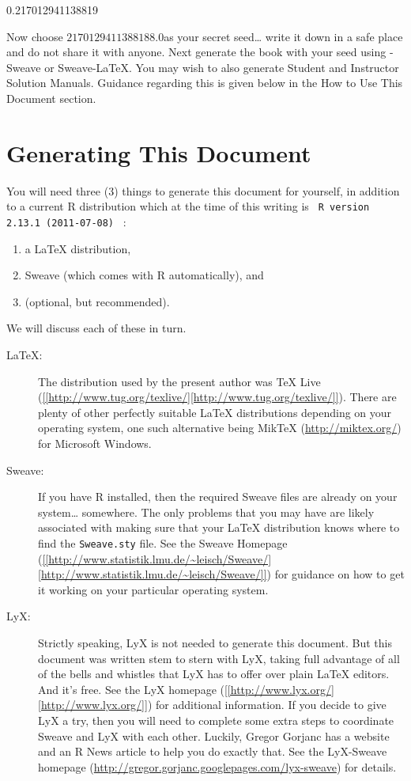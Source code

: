 \documentclass[captions=tableheading]{scrbook}
\begin{document}
0.217012941138819

Now choose \(  2170129411388188.0 \)as your secret seed\ldots{} write it down in a safe place and do not share it with anyone. Next generate the book with your seed using \LyX{}-Sweave or Sweave-\LaTeX{}. You may wish to also generate Student and Instructor Solution Manuals. Guidance regarding this is given below in the How to Use This Document section.
\section{Generating This Document \label{sec:Generating-This-Document}}
\label{sec-23-1}


You will need three (3) things to generate this document for yourself, in addition to a current \textsf{R} distribution which at the time of this writing is \texttt{  R version 2.13.1 (2011-07-08) } :
\begin{enumerate}
\item a \LaTeX{} distribution,
\item Sweave (which comes with \textsf{R} automatically), and
\item \LyX (optional, but recommended).
\end{enumerate}

We will discuss each of these in turn.

\begin{description}
\item[\LaTeX{}:] The distribution used by the present author was \TeX{} Live (\url{[[http://www.tug.org/texlive/][http://www.tug.org/texlive/]]}). There are plenty of other perfectly suitable \LaTeX{} distributions depending on your operating system, one such alternative being MikTeX (\url{http://miktex.org/}) for Microsoft Windows.
\item[Sweave:] If you have \textsf{R} installed, then the required Sweave files are already on your system\ldots{} somewhere. The only problems that you may have are likely associated with making sure that your \LaTeX{} distribution knows where to find the \texttt{Sweave.sty} file. See the Sweave Homepage (\url{[[http://www.statistik.lmu.de/~leisch/Sweave/][http://www.statistik.lmu.de/~leisch/Sweave/]]}) for guidance on how to get it working on your particular operating system.
\item[LyX:] Strictly speaking, LyX is not needed to generate this document. But this document was written stem to stern with LyX, taking full advantage of all of the bells and whistles that LyX has to offer over plain \LaTeX{} editors. And it's free. See the LyX homepage (\url{[[http://www.lyx.org/][http://www.lyx.org/]]}) for additional information. If you decide to give LyX a try, then you will need to complete some extra steps to coordinate Sweave and LyX with each other. Luckily, Gregor Gorjanc has a website and an \textsf{R} News article \cite{Gorjanc2008} to help you do exactly that. See the LyX-Sweave homepage (\url{http://gregor.gorjanc.googlepages.com/lyx-sweave}) for details.
\end{description}
\end{document}
